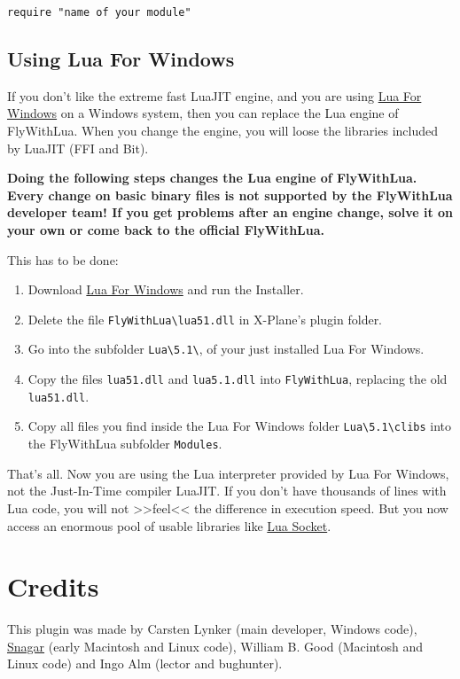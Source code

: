 \documentclass[11pt,parskip=half,a4paper]{scrartcl}
\begin{document}
\verb|require "name of your module"|

\newpage
\subsection{Using Lua For Windows}

If you don't like the extreme fast LuaJIT engine, and you are using \href{http://code.google.com/p/luaforwindows/}{Lua For Windows} on a Windows system, then you can replace the Lua engine of FlyWithLua. When you change the engine, you will loose the libraries included by LuaJIT (FFI and Bit).

\textbf{Doing the following steps changes the Lua engine of FlyWithLua. Every change on basic binary files is not supported by the FlyWithLua developer team! If you get problems after an engine change, solve it on your own or come back to the official FlyWithLua.}

This has to be done:

\begin{enumerate}
\item Download \href{http://code.google.com/p/luaforwindows/}{Lua For Windows} and run the Installer.
\item Delete the file \verb|FlyWithLua\lua51.dll| in X-Plane's plugin folder.
\item Go into the subfolder \verb|Lua\5.1\|, of your just installed Lua For Windows.
\item Copy the files \verb|lua51.dll| and \verb|lua5.1.dll| into \verb|FlyWithLua|, replacing the old \verb|lua51.dll|.
\item Copy all files you find inside the Lua For Windows folder \verb|Lua\5.1\clibs| into the FlyWithLua subfolder \verb|Modules|.
\end{enumerate}

That's all. Now you are using the Lua interpreter provided by Lua For Windows, not the Just-In-Time compiler LuaJIT. If you don't have thousands of lines with Lua code, you will not >>feel<< the difference in execution speed. But you now access an enormous pool of usable libraries like \href{http://w3.impa.br/~diego/software/luasocket/}{Lua Socket}.

\newpage
\section{Credits}

This plugin was made by Carsten Lynker (main developer, Windows code), \href{http://www.snagar.org/}{Snagar} (early Macintosh and Linux code), William B. Good (Macintosh and Linux code) and Ingo Alm (lector and bughunter).
\end{document}
